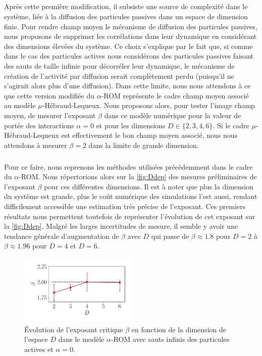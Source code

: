 \subparagraph{}Après cette première modification, il subsiste une source de complexité dans le système, liée à la diffusion des particules passives dans un espace de dimension finie. Pour rendre champ moyen le mécanisme de diffusion des particules passives, nous proposons de supprimer les corrélations dans leur dynamique en considérant des dimensions élevées du système. Ce choix s'explique par le fait que, si comme dans le cas des particules actives nous considérons des particules passives faisant des sauts de taille infinie pour décorréler leur dynamique, le mécanisme de création de l'activité par diffusion serait complètement perdu (puisqu'il ne s'agirait alors plus d'une diffusion). Dans cette limite, nous nous attendons à ce que cette version modifiée du $\alpha$-ROM représente le cadre champ moyen associé au modèle $\mu$-Hébraud-Lequeux. Nous proposons alors, pour tester l'image champ moyen, de mesurer l'exposant $\beta$ dans ce modèle numérique pour la valeur de portée des interactions $\alpha = 0$ et pour les dimensions $D\in\{2,3,4,6\}$. Si le cadre $\mu$-Hébraud-Lequeux est effectivement le bon champ moyen associé, nous nous attendons à mesurer $\beta = 2$ dans la limite de grande dimension.

\subparagraph{}Pour ce faire, nous reprenons les méthodes utilisées précédemment dans le cadre du $\alpha$-ROM. Nous répertorions alors sur la \autoref{fig:Ddep} des mesures préliminaires de l'exposant $\beta$ pour ces différentes dimensions. Il est à noter que plus la dimension du système est grande, plus le coût numérique des simulations l'est aussi, rendant difficilement accessible une estimation très précise de l'exposant. Ces premiers résultats nous permettent toutefois de représenter l'évolution de cet exposant sur la \autoref{fig:Ddep}. Malgré les larges incertitudes de mesure, il semble y avoir une tendance générale d'augmentation de $\beta$ avec $D$ qui passe de $\beta \approx 1.8$ pour $D=2$ à $\beta \approx 1.96$ pour $D=4$ et $D=6$.

\begin{figure}[h]
	\centering
	\includegraphics[width=0.5\textwidth]{Chapitre3/Figures/Interpretation/D_dependence.pdf}
	\caption{Évolution de l'exposant critique $\beta$ en fonction de la dimension de l'espace $D$ dans le modèle $\alpha$-ROM avec sauts infinis des particules actives et $\alpha = 0$.}
	\label{fig:Ddep}
\end{figure}

